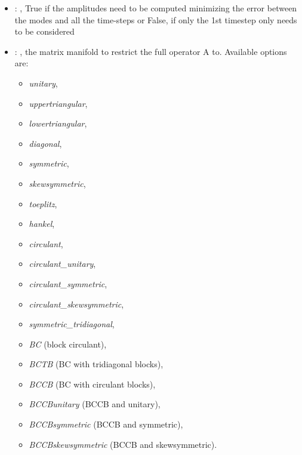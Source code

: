 \begin{itemize}
    \item {}: , 
      True if the amplitudes need to be computed minimizing the error
      between the modes and all the time-steps or False, if only the 1st timestep only needs to be
      considered

    \item {}: , 
      the matrix manifold to restrict the full operator A to. Available options are:
      \begin{itemize}                                                   \item \textit{unitary},
      \item \textit{uppertriangular},                                                   \item
      \textit{lowertriangular},                                                   \item
      \textit{diagonal},                                                   \item \textit{symmetric},
      \item \textit{skewsymmetric},                                                   \item
      \textit{toeplitz},                                                   \item \textit{hankel},
      \item \textit{circulant},                                                   \item
      \textit{circulant\_unitary},                                                   \item
      \textit{circulant\_symmetric},                                                   \item
      \textit{circulant\_skewsymmetric},                                                   \item
      \textit{symmetric\_tridiagonal},                                                   \item
      \textit{BC} (block circulant),                                                   \item
      \textit{BCTB} (BC with tridiagonal blocks),
      \item \textit{BCCB} (BC with circulant blocks),
      \item \textit{BCCBunitary} (BCCB and unitary),
      \item \textit{BCCBsymmetric} (BCCB and symmetric),
      \item \textit{BCCBskewsymmetric} (BCCB and skewsymmetric).
      \end{itemize}


\end{itemize}

